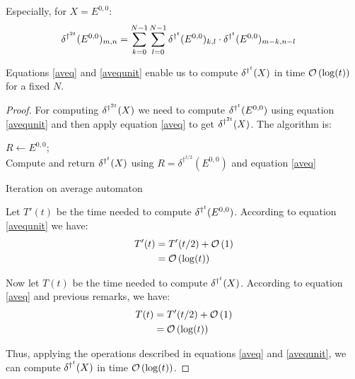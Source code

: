 Especially, for $X = E^{0,0}$:
\begin{equation}
 \label{avequnit}
 \begin{split}
    \delta^{\dag^{2t}} (E^{0,0})_{m,n} & = \sum_{k=0}^{N-1} \sum_{l=0}^{N-1} \delta^{\dag^t} (E^{0,0})_{k,l} \cdot \delta^{\dag^t} (E^{0,0})_{m-k,n-l}
 \end{split}
\end{equation}

\begin{prop}
 Equations \ref{aveq} and \ref{avequnit} enable us to compute $\delta^{\dag^t}(X)$ in time $\mathcal O \left( \log(t) \right)$ for a fixed $N$.
\end{prop}

\begin{proof}
For computing $\delta^{\dag^{2t}}(X)$ we need to compute $\delta^{\dag^t}(E^{0,0})$ using equation \ref{avequnit} and then apply equation \ref{aveq} to get $\delta^{\dag^{2t}}(X)$. The algorithm is:

\begin{algorithm}[H]
    \DontPrintSemicolon
    \LinesNotNumbered
        $R \leftarrow E^{0,0}$; \\
        Compute and return $\delta^{\dag^t}(X)$ using $R = \delta^{\dag^{t/2}}(E^{0,0})$ and equation \ref{aveq}
\caption{Iteration on average automaton\label{algoq5}}
\end{algorithm}

 Let $T'(t)$ be the time needed to compute $\delta^{\dag^t}(E^{0,0})$. According to equation \ref{avequnit} we have:
 \[\begin{split}
    T'(t) & = T'(t/2) + \mathcal O \left( 1 \right)\\
         & = \mathcal O \left( \log(t) \right)
   \end{split}
\]
 
 Now let $T(t)$ be the time needed to compute $\delta^{\dag^t}(X)$. According to equation \ref{aveq} and previous remarks, we have:
 \[\begin{split}
    T(t) & = T'(t/2) + \mathcal O \left( 1 \right) \\
    & = \mathcal O \left( \log(t) \right)
   \end{split}
\]
 
 Thus, applying the operations described in equations \ref{aveq} and \ref{avequnit}, we can compute $\delta^{\dag^t}(X)$ in time $\mathcal O \left( \log(t) \right)$. 
\end{proof}

